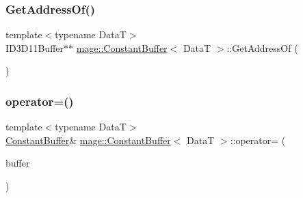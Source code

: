 \hypertarget{structmage_1_1_constant_buffer_a5ec29403969893822f364e26c22efcae}{}\label{structmage_1_1_constant_buffer_a5ec29403969893822f364e26c22efcae} 
\subsubsection{\texorpdfstring{Get\+Address\+Of()}{GetAddressOf()}\hspace{0.1cm}{\footnotesize\ttfamily [2/2]}}
{\footnotesize\ttfamily template$<$typename DataT$>$ \\
I\+D3\+D11\+Buffer$\ast$$\ast$ \hyperlink{structmage_1_1_constant_buffer}{mage\+::\+Constant\+Buffer}$<$ DataT $>$\+::Get\+Address\+Of (\begin{DoxyParamCaption}{ }\end{DoxyParamCaption})}

\hypertarget{structmage_1_1_constant_buffer_acb1a4f4b656073609075b5e89dea6973}{}\label{structmage_1_1_constant_buffer_acb1a4f4b656073609075b5e89dea6973} 
\subsubsection{\texorpdfstring{operator=()}{operator=()}\hspace{0.1cm}{\footnotesize\ttfamily [1/2]}}
{\footnotesize\ttfamily template$<$typename DataT$>$ \\
\hyperlink{structmage_1_1_constant_buffer}{Constant\+Buffer}\& \hyperlink{structmage_1_1_constant_buffer}{mage\+::\+Constant\+Buffer}$<$ DataT $>$\+::operator= (\begin{DoxyParamCaption}\item[{const \hyperlink{structmage_1_1_constant_buffer}{Constant\+Buffer}$<$ DataT $>$ \&}]{buffer }\end{DoxyParamCaption})\hspace{0.3cm}{\ttfamily [delete]}}

\hypertarget{structmage_1_1_constant_buffer_ad050b1f0f03a5fcd2b51977a744781a3}{}\label{structmage_1_1_constant_buffer_ad050b1f0f03a5fcd2b51977a744781a3} 
